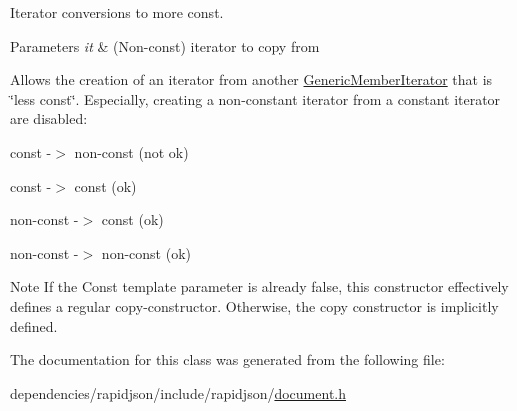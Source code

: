 Iterator conversions to more const. 


\begin{DoxyParams}{Parameters}
{\em it} & (Non-\/const) iterator to copy from\\
\hline
\end{DoxyParams}
Allows the creation of an iterator from another \hyperlink{class_generic_member_iterator}{Generic\+Member\+Iterator} that is \char`\"{}less const\char`\"{}. Especially, creating a non-\/constant iterator from a constant iterator are disabled\+: \begin{DoxyItemize}
\item const -\/$>$ non-\/const (not ok) \item const -\/$>$ const (ok) \item non-\/const -\/$>$ const (ok) \item non-\/const -\/$>$ non-\/const (ok)\end{DoxyItemize}
\begin{DoxyNote}{Note}
If the {\ttfamily Const} template parameter is already {\ttfamily false}, this constructor effectively defines a regular copy-\/constructor. Otherwise, the copy constructor is implicitly defined. 
\end{DoxyNote}


The documentation for this class was generated from the following file\+:\begin{DoxyCompactItemize}
\item 
dependencies/rapidjson/include/rapidjson/\hyperlink{document_8h}{document.\+h}\end{DoxyCompactItemize}
